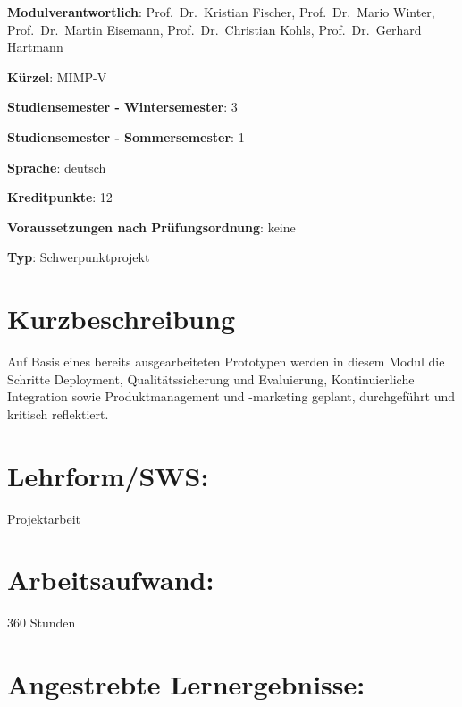 \begin{modulHead}
\textbf{Modulverantwortlich}: Prof.~Dr.~Kristian
Fischer, Prof.~Dr.~Mario Winter, Prof.~Dr.~Martin Eisemann,
Prof.~Dr.~Christian Kohls, Prof.~Dr.~Gerhard
Hartmann
\end{modulHead}
\begin{modulHead}
\textbf{Kürzel}:
MIMP-V
\end{modulHead}
\begin{modulHead}
\textbf{Studiensemester -
Wintersemester}:
3
\end{modulHead}
\begin{modulHead}
\textbf{Studiensemester -
Sommersemester}: 1
\end{modulHead}
\begin{modulHead}
\textbf{Sprache}:
deutsch
\end{modulHead}
\begin{modulHead}
\textbf{Kreditpunkte}:
12
\end{modulHead}
\begin{modulHead}
\textbf{Voraussetzungen nach
Prüfungsordnung}: keine
\end{modulHead}
\begin{modulHead}
\textbf{Typ}:
Schwerpunktprojekt
\end{modulHead}


\section*{Kurzbeschreibung}\label{kurzbeschreibung-8}

Auf Basis eines bereits ausgearbeiteten Prototypen werden in diesem
Modul die Schritte Deployment, Qualitätssicherung und Evaluierung,
Kontinuierliche Integration sowie Produktmanagement und -marketing
geplant, durchgeführt und kritisch reflektiert.

\section*{Lehrform/SWS:}\label{lehrformsws-10}

Projektarbeit

\section*{Arbeitsaufwand:}\label{arbeitsaufwand-15}

360 Stunden

\section*{Angestrebte
Lernergebnisse:}\label{angestrebte-lernergebnisse-9}


